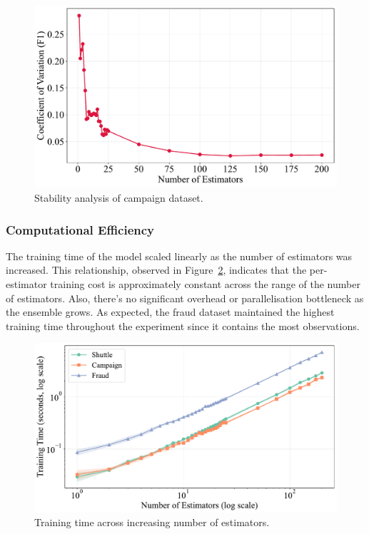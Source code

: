 \documentclass[10pt, conference]{IEEEtran}
\begin{document}
\begin{figure}[H]
	\centering
	\includegraphics[width=0.95\linewidth]{../results/campaign/n_estimators/stability_analysis.pdf}
	\caption{Stability analysis of campaign dataset.}
	\label{fig:n_estimators_var}
\end{figure}

\subsubsection{Computational Efficiency}
The training time of the model scaled linearly as the number of estimators was increased. This relationship, observed in Figure~\ref{fig:n_estimators_tt}, indicates that the per-estimator training cost is approximately constant across the range of the number of estimators. Also, there's no significant overhead or parallelisation bottleneck as the ensemble grows. As expected, the fraud dataset maintained the highest training time throughout the experiment since it contains the most observations.
\begin{figure}[H]
	\centering
	\includegraphics[width=0.95\linewidth]{../results/multi_dataset/n_estimators_training_time.pdf}
	\caption{Training time across increasing number of estimators.}
	\label{fig:n_estimators_tt}
\end{figure}
\end{document}
